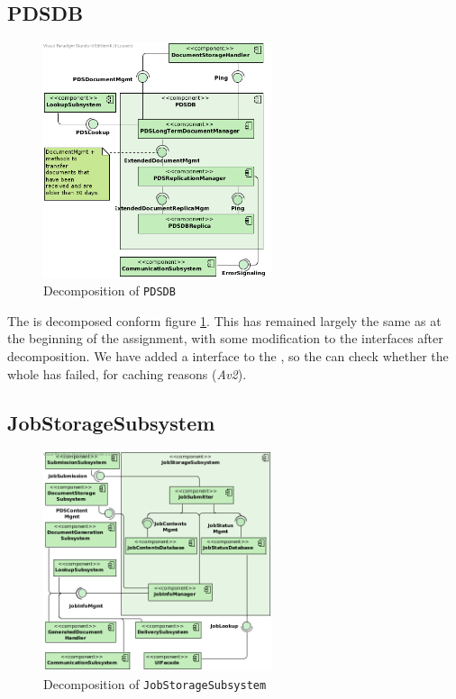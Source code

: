 \subsection{PDSDB}
\begin{figure}[!htp]
    \centering
    \includegraphics[width=0.6\textwidth]{figures/PDSDB.png}
    \caption{Decomposition of \texttt{PDSDB}}\label{fig:decomp-pdsdb}
\end{figure}

The  is decomposed conform figure \ref{fig:decomp-pdsdb}. This has remained largely the same as at the beginning of the assignment, with some modification to the interfaces after decomposition. We have added a  interface to the , so the  can check whether the whole  has failed, for caching reasons (\emph{Av2}).

\subsection{JobStorageSubsystem}
\begin{figure}[!htp]
    \centering
    \includegraphics[width=0.6\textwidth]{figures/Job Storage Subsystem.png}
    \caption{Decomposition of \texttt{JobStorageSubsystem}}\label{fig:decomp-jobsub}
\end{figure}

